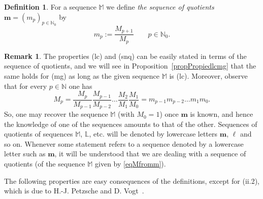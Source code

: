 \documentclass[11pt,a4paper]{article}
\theoremstyle{definition}
\newtheorem{defi}[theo]{Definition}
\newtheorem{rema}[theo]{Remark}
\def\bl{\boldsymbol{\ell}}
\def\N{\mathbb{N}}
\def\M{\mathbb{M}}
\def\L{\mathbb{L}} %
\def\m{\boldsymbol{m}}
\def\bm{\boldsymbol{m}}
\begin{document}
\begin{defi} For a sequence $\M$ we define {\it the sequence of quotients} $\m=(m_p)_{p\in\N_0}$ by $$m_p:=\frac{M_{p+1}}{M_p} \qquad p\in \N_0.$$
\end{defi}

\begin{rema}\label{remaequivMm}
The properties (lc) and (snq) can be easily stated in terms of the sequence of quotients, and we will see in Proposition~\ref{propPropiedlcmg} that the same holds for (mg) as long as the given sequence $\M$ is (lc). Moreover,
observe that for every $p\in\N$ one has
\begin{equation}\label{eqMfromm}
M_p=\frac{M_p}{M_{p-1}}\frac{M_{p-1}}{M_{p-2}}\dots\frac{M_2}{M_{1}}\frac{M_1}{M_{0}}= m_{p-1}m_{p-2}\dots m_1m_0.
\end{equation}
So, one may recover the sequence $\M$ (with $M_0=1$) once $\bm$ is known, and hence the knowledge of one of the sequences amounts to that of the other.
Sequences of quotients of sequences $\M$, $\L$, etc. will be denoted by lowercase letters $\bm$, $\bl$ and so on. Whenever some statement
refers to a sequence denoted by a lowercase letter such as $\bm$, it will be understood that we are dealing with a sequence of quotients (of the sequence $\M$ given by \eqref{eqMfromm}).
\end{rema}

The following properties are easy consequences of the definitions, except for (ii.2), which is due to H.-J. Petzsche and D. Vogt~\cite{petvog}.
\end{document}
